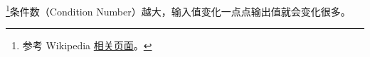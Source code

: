
\begin{issues}
\issueDraft
\end{issues}

\footnote{参考 Wikipedia \href{https://en.wikipedia.org/wiki/Condition_number}{相关页面}。}条件数（Condition Number）越大，输入值变化一点点输出值就会变化很多。

